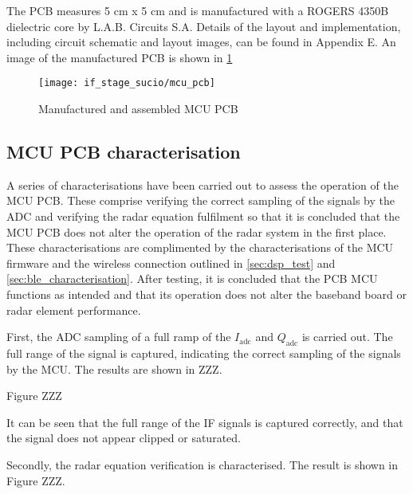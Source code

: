 The PCB measures 5 cm x 5 cm and is manufactured with a ROGERS 4350B dielectric core by L.A.B. Circuits S.A. Details of the layout and implementation, including circuit schematic and layout images, can be found in Appendix E. %
An image of the manufactured PCB is shown in \cref{fig:mcu_pcb}

\begin{figure}[h]
	\centering
	\texttt{[image: if\_stage\_sucio/mcu\_pcb]}
	\caption{Manufactured and assembled MCU PCB}
	\label{fig:mcu_pcb}
\end{figure}

\subsection{MCU PCB characterisation}

A series of characterisations have been carried out to assess the operation of the MCU PCB. These comprise verifying the correct sampling of the signals by the ADC and verifying the radar equation fulfilment so that it is concluded that the MCU PCB does not alter the operation of the radar system in the first place. These characterisations are complimented by the characterisations of the MCU firmware and the wireless connection outlined in \cref{sec:dsp_test} and \cref{sec:ble_characterisation}.
After testing, it is concluded that the PCB MCU functions as intended and that its operation does not alter the baseband board or radar element performance.

First, the ADC sampling of a full ramp of the $I_\mathrm{adc}$ and $Q_\mathrm{adc}$ is carried out. The full range of the signal is captured, indicating the correct sampling of the signals by the MCU. The results are shown in ZZZ.

Figure ZZZ

It can be seen that the full range of the IF signals is captured correctly, and that the signal does not appear clipped or saturated.

Secondly, the radar equation verification is characterised.
The result is shown in Figure ZZZ.

